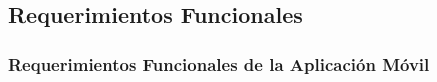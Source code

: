 \subsection{Requerimientos Funcionales}
\subsubsection{Requerimientos Funcionales de la Aplicación Móvil}